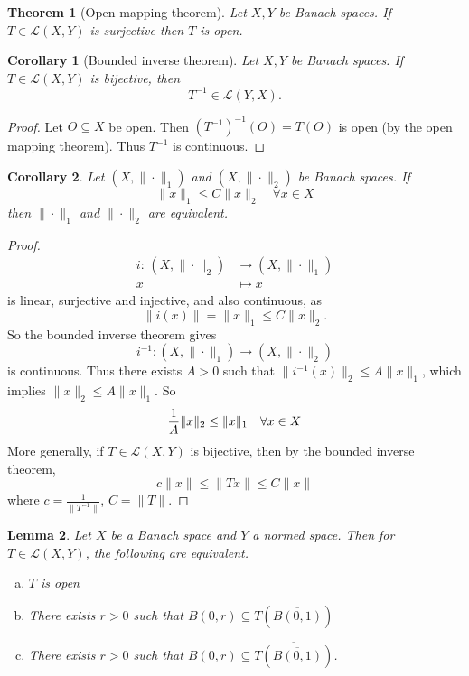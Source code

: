 \documentclass[justified]{tufte-book}
\theoremstyle{plain}%
\newtheorem{thm}{Theorem}[chapter]
\newtheorem{lem}[thm]{Lemma}
\newtheorem*{cor}{Corollary}
\theoremstyle{definition}
\theoremstyle{remark}
\newcommand{\mapping}[5]{\begin{align*}
#1 : \,     #2 &\rightarrow #3 \\
		#4  &\mapsto #5
\end{align*}	
}
\begin{document}
\begin{thm}[Open mapping theorem]
  Let $X, Y$ be Banach spaces.  If $T \in \mathcal{L}(X,Y)$ is surjective then $T$ is open. 
\end{thm}

\begin{cor}[Bounded inverse theorem]
  Let $X, Y$ be Banach spaces.  If $T \in \mathcal L(X,Y)$ is bijective, then \[
      T^{-1} \in \mathcal L(Y,X).
  \]
  
\end{cor}
\begin{proof}
  Let $O \subseteq X$ be open.  Then $(T^{-1})^{-1}(O) = T(O)$ is open (by the open mapping theorem).  Thus $T^{-1}$ is continuous.
\end{proof}

\begin{cor}
  Let $(X, \| \cdot \|_1)$ and $(X, \| \cdot \|_2)$ be Banach spaces.  If \[
      \| x \|_1 \leq C \| x \|_2 \quad \forall x \in X
  \] then $\| \cdot \|_1$ and $\| \cdot \|_2$ are equivalent.  
\end{cor}
\begin{proof}
  \mapping{i}{(X, \| \cdot \|_2)}{(X, \| \cdot \|_1)}{ x}{x} is linear, surjective and injective, and also continuous, as \[
      \|i(x) \| = \| x \|_1 \leq C \| x \|_2.
  \]  So the bounded inverse theorem gives \[
      i^{-1} : (X, \| \cdot \|_1) \rightarrow (X, \| \cdot \|_2)
  \] is continuous.  Thus there exists $A > 0$ such that $\| i^{-1}(x)\|_2 \leq A \| x \|_1$, which implies $\| x \|_2 \leq A \| x \|_1$.  So \[
      \frac{1}{A} \| x \|_2 \leq \| x \|_1 \quad \forall x \in X \qedhere
  \]  More generally, if $T \in \mathcal L(X,Y)$ is bijective, then by the bounded inverse theorem, \[
      c \| x \| \leq \| Tx \| \leq C \| x \|
  \] where $c  = \frac{1}{ \| T^{-1} \|}$, $C = \| T \|$.  
\end{proof} 



\begin{lem}
  Let $X$ be a Banach space and $Y$ a normed space.  Then for $T \in \mathcal L(X, Y)$, the following are equivalent.
  \begin{enumerate}[(a)]
      \item $T$ is open
      \item There exists $r > 0$ such that $B(0, r) \subseteq T(\overline{B(0, 1)})$
      \item There exists $r > 0$ such that $B(0, r) \subseteq \overline{T(\overline{B(0, 1)})}$.
  \end{enumerate} 
\end{lem}
\end{document}
